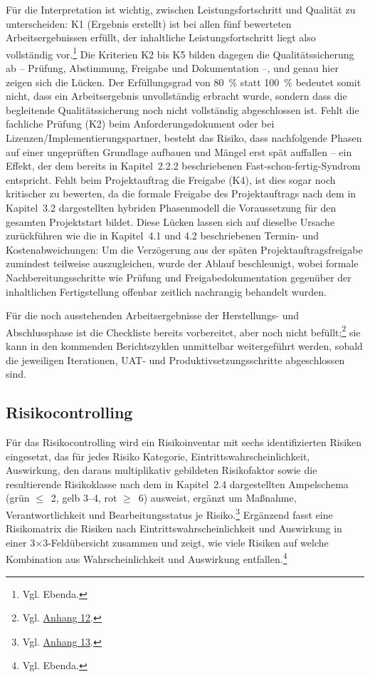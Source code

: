 \documentclass[
    12pt, 
    a4paper,
    ]{scrartcl} %
\begin{document}
Für die Interpretation ist wichtig, zwischen Leistungsfortschritt und Qualität zu unterscheiden: K1 (Ergebnis erstellt) ist bei allen fünf bewerteten Arbeitsergebnissen erfüllt, der inhaltliche Leistungsfortschritt liegt also vollständig vor.\footnote{Vgl. Ebenda.} Die Kriterien K2 bis K5 bilden dagegen die Qualitätssicherung ab -- Prüfung, Abstimmung, Freigabe und Dokumentation --, und genau hier zeigen sich die Lücken. Der Erfüllungsgrad von 80~\% statt 100~\% bedeutet somit nicht, dass ein Arbeitsergebnis unvollständig erbracht wurde, sondern dass die begleitende Qualitätssicherung noch nicht vollständig abgeschlossen ist. Fehlt die fachliche Prüfung (K2) beim Anforderungsdokument oder bei Lizenzen/Implementierungspartner, besteht das Risiko, dass nachfolgende Phasen auf einer ungeprüften Grundlage aufbauen und Mängel erst spät auffallen -- ein Effekt, der dem bereits in Kapitel~2.2.2 beschriebenen Fast-schon-fertig-Syndrom entspricht. Fehlt beim Projektauftrag die Freigabe (K4), ist dies sogar noch kritischer zu bewerten, da die formale Freigabe des Projektauftrags nach dem in Kapitel~3.2 dargestellten hybriden Phasenmodell die Voraussetzung für den gesamten Projektstart bildet. Diese Lücken lassen sich auf dieselbe Ursache zurückführen wie die in Kapitel~4.1 und 4.2 beschriebenen Termin- und Kostenabweichungen: Um die Verzögerung aus der späten Projektauftragsfreigabe zumindest teilweise auszugleichen, wurde der Ablauf beschleunigt, wobei formale Nachbereitungsschritte wie Prüfung und Freigabedokumentation gegenüber der inhaltlichen Fertigstellung offenbar zeitlich nachrangig behandelt wurden.

Für die noch ausstehenden Arbeitsergebnisse der Herstellungs- und Abschlussphase ist die Checkliste bereits vorbereitet, aber noch nicht befüllt;\footnote{Vgl. \hyperref[sec:Anhang12]{Anhang 12}.} sie kann in den kommenden Berichtszyklen unmittelbar weitergeführt werden, sobald die jeweiligen Iterationen, UAT- und Produktivsetzungsschritte abgeschlossen sind.

\subsection{Risikocontrolling}

Für das Risikocontrolling wird ein Risikoinventar mit sechs identifizierten Risiken eingesetzt, das für jedes Risiko Kategorie, Eintrittswahrscheinlichkeit, Auswirkung, den daraus multiplikativ gebildeten Risikofaktor sowie die resultierende Risikoklasse nach dem in Kapitel~2.4 dargestellten Ampelschema (grün $\leq$~2, gelb 3--4, rot $\geq$~6) ausweist, ergänzt um Maßnahme, Verantwortlichkeit und Bearbeitungsstatus je Risiko.\footnote{Vgl. \hyperref[sec:Anhang13]{Anhang 13}.} Ergänzend fasst eine Risikomatrix die Risiken nach Eintrittswahrscheinlichkeit und Auswirkung in einer 3$\times$3-Feldübersicht zusammen und zeigt, wie viele Risiken auf welche Kombination aus Wahrscheinlichkeit und Auswirkung entfallen.\footnote{Vgl. Ebenda.}
\end{document}
